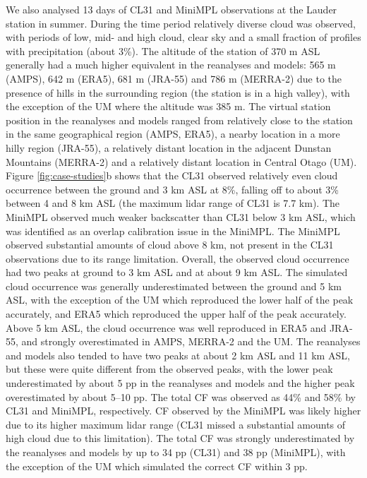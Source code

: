 We also analysed 13 days of CL31 and MiniMPL observations at the Lauder station
in summer. During the time period relatively diverse cloud was observed,
with periods of low, mid- and high cloud, clear sky and a small fraction
of profiles with precipitation (about 3\%). The altitude of the station of 370 m
ASL generally had a much higher equivalent in the reanalyses and models:
565 m (AMPS), 642 m (ERA5), 681 m (JRA-55) and 786 m (MERRA-2) due to the
presence of hills in the surrounding region (the station is in a high valley),
with the exception of the UM where the altitude was 385 m. The virtual station position in the
reanalyses and models ranged from relatively close to the station in the same
geographical region (AMPS, ERA5), a nearby location in a more hilly region
(JRA-55), a relatively distant location in the adjacent Dunstan Mountains
(MERRA-2) and a relatively distant location in Central Otago (UM).
Figure \ref{fig:case-studies}b shows that the CL31 observed relatively even cloud occurrence between the ground
and 3 km ASL at 8\%, falling off to about 3\% between 4 and 8 km ASL
(the maximum lidar range of CL31 is 7.7 km). The MiniMPL observed much weaker
backscatter than CL31 below 3 km ASL, which was identified as an overlap
calibration issue in the MiniMPL.
The MiniMPL observed
substantial amounts of cloud above 8 km, not present in the CL31 observations
due to its range limitation. Overall, the observed cloud occurrence had two
peaks at ground to 3 km ASL and at about 9 km ASL. The simulated cloud
occurrence was generally underestimated between the ground and 5 km ASL,
with the exception of the UM which reproduced the lower half of the peak
accurately, and ERA5 which reproduced the upper half of the peak accurately.
Above 5 km ASL, the cloud occurrence was well reproduced in ERA5 and JRA-55,
and strongly overestimated in AMPS, MERRA-2 and the UM. The reanalyses and models also
tended to have two peaks at about 2 km ASL and 11 km ASL, but these were quite
different from the observed peaks, with the lower peak underestimated by about
5 pp in the reanalyses and models and the higher peak overestimated by about 5--10 pp.
The total CF was observed as 44\% and 58\% by CL31 and MiniMPL, respectively.
CF observed by the MiniMPL was likely higher due to its higher maximum lidar range
(CL31 missed a substantial amounts of high cloud due to this limitation).
The total CF was strongly underestimated by the reanalyses and models
by up to 34 pp (CL31) and 38 pp (MiniMPL), with the exception of the UM
which simulated the correct CF within 3 pp.


